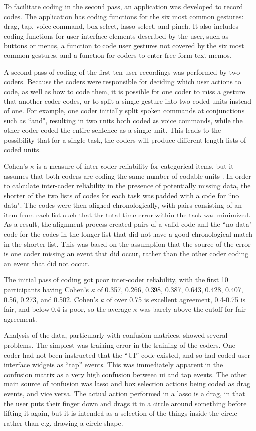To facilitate coding in the second pass, an application was developed to record codes. 
The application has coding functions for the six most common gestures: drag, tap, voice command, box select, lasso select, and pinch. 
It also includes coding functions for user interface elements described by the user, such as buttons or menus, a function to code user gestures not covered by the six most common gestures, and a function for coders to enter free-form text memos. 

A second pass of coding of the first ten user recordings was performed by two coders. 
Because the coders were responsible for deciding which user actions to code, as well as how to code them, it is possible for one coder to miss a gesture that another coder codes, or to split a single gesture into two coded units instead of one. 
For example, one coder initially split spoken commands at conjunctions such as ``and", resulting in two units both coded as voice commands, while the other coder coded the entire sentence as a single unit. 
This leads to the possibility that for a single task, the coders will produce different length lists of coded units. 

Cohen's $\kappa$ is a measure of inter-coder reliability for categorical items, but it assumes that both coders are coding the same number of codable units \citep{cohen1960coefficient}. 
In order to calculate inter-coder reliability in the presence of potentially missing data, the  shorter of the two lists of codes for each task was padded with a code for ``no data". 
The codes were then aligned chronologically, with pairs consisting of an item from each list such that the total time error within the task was minimized.
As a result, the alignment process created pairs of a valid code and the ``no data" code for the codes in the longer list that did not have a good chronological match in the shorter list.
This was based on the assumption that the source of the error is one coder missing an event that did occur, rather than the other coder coding an event that did not occur. 

The initial pass of coding got poor inter-coder reliability, with the first 10 participants having Cohen's $\kappa$ of 0.357, 0.266, 0.398, 0.387, 0.643, 0.428, 0.407, 0.56, 0.273, and 0.502. 
Cohen's $\kappa$ of over 0.75 is excellent agreement, 0.4-0.75 is fair, and below 0.4 is poor, so the average $\kappa$ was barely above the cutoff for fair agreement. 

Analysis of the data, particularly with confusion matrices, showed several problems. 
The simplest was training error in the training of the coders.
One coder had not been instructed that the ``UI'' code existed, and so had coded user interface widgets as ``tap'' events.   
This was immediately apparent in the confusion matrix as a very high confusion between ui and tap events. 
The other main source of confusion was lasso and box selection actions being coded as drag events, and vice versa.
The actual action performed in a lasso is a drag, in that the user puts their finger down and drags it in a circle around something before lifting it again, but it is intended as a selection of the things inside the circle rather than e.g. drawing a circle shape. 

